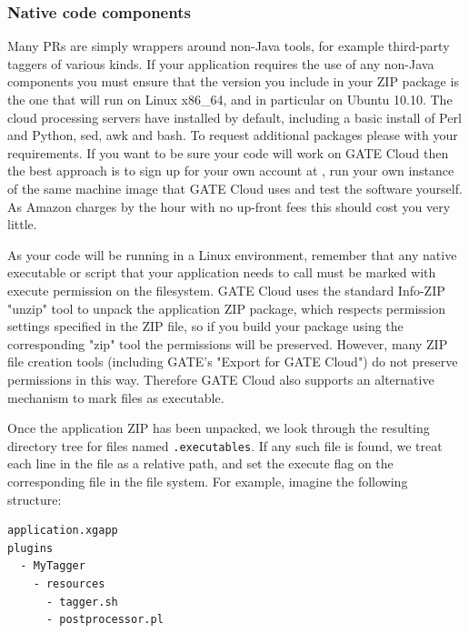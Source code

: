 \subsubsection{Native code components}

Many PRs are simply wrappers around non-Java tools, for example third-party
taggers of various kinds.  If your application requires the use of any non-Java
components you must ensure that the version you include in your ZIP package is
the one that will run on Linux x86\_64, and in particular on Ubuntu 10.10.  The
cloud processing servers have
installed by default, including a basic install of Perl and Python, sed, awk
and bash.  To request additional packages please 
 with
your requirements.  If you want to be sure your code will work on GATE Cloud
then the best approach is to sign up for your own account at
, run your own instance of the
{same machine image} that GATE Cloud uses and test the software yourself.  
As Amazon charges by the hour with no up-front fees this should cost you very 
little.

As your code will be running in a Linux environment, remember that any native
executable or script that your application needs to call must be marked with
execute permission on the filesystem.  GATE Cloud uses the standard Info-ZIP
"unzip" tool to unpack the application ZIP package, which respects permission
settings specified in the ZIP file, so if you build your package using the
corresponding "zip" tool the permissions will be preserved.  However, many ZIP
file creation tools (including GATE's "Export for GATE Cloud") do not preserve
permissions in this way.  Therefore GATE Cloud also supports an alternative
mechanism to mark files as executable.

Once the application ZIP has been unpacked, we look through the resulting
directory tree for files named \verb^.executables^.  If any such file is found,
we treat each line in the file as a relative path, and set the execute flag on
the corresponding file in the file system.  For example, imagine the following
structure:

\begin{small}
\begin{verbatim}
application.xgapp
plugins
  - MyTagger
    - resources
      - tagger.sh
      - postprocessor.pl
\end{verbatim}
\end{small}

